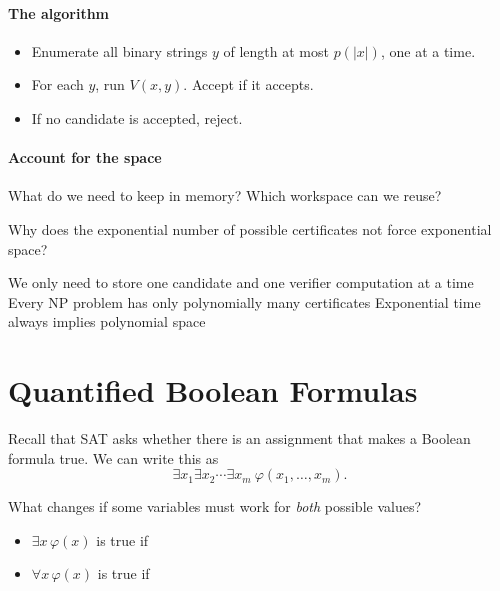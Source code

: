 \documentclass[11  pt]{article}
\begin{document}
\paragraph{The algorithm}
\begin{itemize}
    \item Enumerate all binary strings $y$ of length at most $p(|x|)$, one at a time.
    \item For each $y$, run $V(x,y)$. Accept if it accepts.
    \item If no candidate is accepted, reject.
\end{itemize}

\paragraph{Account for the space}
What do we need to keep in memory? Which workspace can we reuse?
\vs{2cm}

\begin{Qu}
    Why does the exponential number of possible certificates not force exponential space?
    \begin{itemize}
        \aitem We only need to store one candidate and one verifier computation at a time
        \bitem Every NP problem has only polynomially many certificates
        \citem Exponential time always implies polynomial space
    \end{itemize}
\end{Qu}


\newpage
\section{Quantified Boolean Formulas}
Recall that SAT asks whether there is an assignment that makes a Boolean formula true. We can write this as
\begin{equation*}
    \exists x_1\exists x_2\cdots\exists x_m\ \varphi(x_1,\ldots,x_m).
\end{equation*}

What changes if some variables must work for \emph{both} possible values?
\begin{itemize}
    \item $\exists x\,\varphi(x)$ is true if 
    \item $\forall x\,\varphi(x)$ is true if 
\end{itemize}
\end{document}
